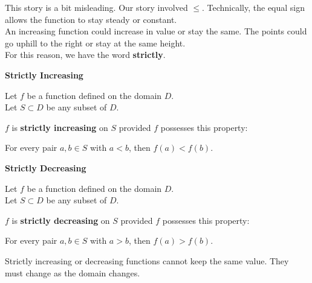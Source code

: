 \documentclass{ximera}
\begin{document}
This story is a bit misleading.  Our story involved $\leq$.  Technically, the equal sign allows the function to stay steady or constant. \\

An increasing function could increase in value or stay the same.  The points could go uphill to the right or stay at the same height. \\

For this reason, we have the word \textbf{strictly}.








\begin{definition} \textbf{\textcolor{green!50!black}{Strictly Increasing}} 


Let $f$ be a function defined on the domain $D$. \\
Let $S \subset D$ be any subset of $D$.

$f$ is \textbf{strictly increasing} on $S$ provided $f$ possesses this property:  


\begin{center}
For every pair $a, b \in S$ with $a < b$, then $f(a) < f(b)$.
\end{center}

\end{definition}








\begin{definition} \textbf{\textcolor{green!50!black}{Strictly Decreasing}} 


Let $f$ be a function defined on the domain $D$. \\
Let $S \subset D$ be any subset of $D$.

$f$ is \textbf{strictly decreasing} on $S$ provided $f$ possesses this property:  


\begin{center}
For every pair $a, b \in S$ with $a > b$, then $f(a) > f(b)$.
\end{center}

\end{definition}




Strictly increasing or decreasing functions cannot keep the same value.  They must change as the domain changes.
\end{document}
